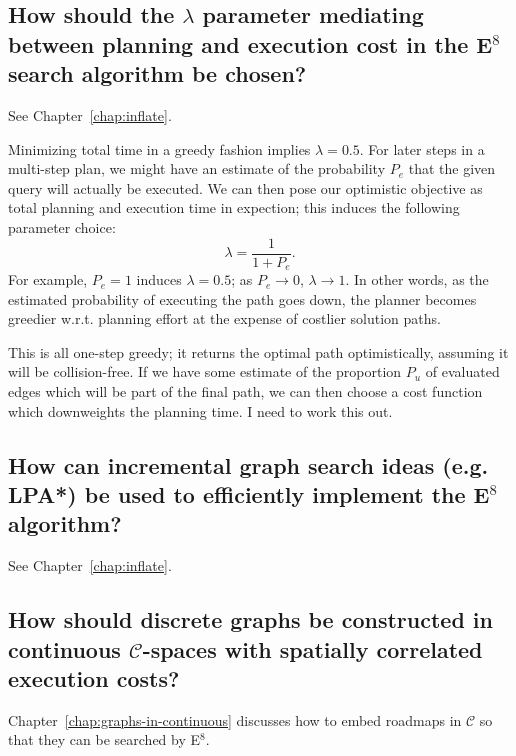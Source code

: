 {
\renewcommand\thesubsection{Q\arabic{subsection}}

\subsection{How should the $\lambda$ parameter mediating
   between planning and execution cost in the E$^8$
   search algorithm be chosen?}
\label{ques:choosing-lambda}

See Chapter~\ref{chap:inflate}.

Minimizing total time in a greedy fashion implies $\lambda = 0.5$.
For later steps in a multi-step plan,
we might have an estimate of the probability $P_e$ that the given query will
actually be executed.
We can then pose our optimistic objective as total planning and execution
time in expection;
this induces the following parameter choice:
\begin{equation}
   \lambda = \frac{1}{1 + P_e} .
\end{equation}
For example, $P_e=1$ induces $\lambda = 0.5$;
as $P_e \rightarrow 0$, $\lambda \rightarrow 1$.
In other words,
as the estimated probability of executing the path goes down,
the planner becomes greedier w.r.t. planning effort at the expense of
costlier solution paths.

This is all one-step greedy;
it returns the optimal path optimistically,
assuming it will be collision-free.
If we have some estimate of the proportion $P_u$ of evaluated edges
which will be part of the final path,
we can then choose a cost function which downweights the planning time.
I need to work this out.

\subsection{How can incremental graph search ideas (e.g. LPA*)
   be used to efficiently implement the E$^8$ algorithm?}
\label{ques:incremental-search}

See Chapter~\ref{chap:inflate}.

\subsection{How should discrete graphs be constructed in continuous
   $\mathcal{C}$-spaces with spatially correlated execution costs?}
\label{ques:batching}

Chapter~\ref{chap:graphs-in-continuous}
discusses how to embed roadmaps in $\mathcal{C}$
so that they can be searched by E$^8$.

}
